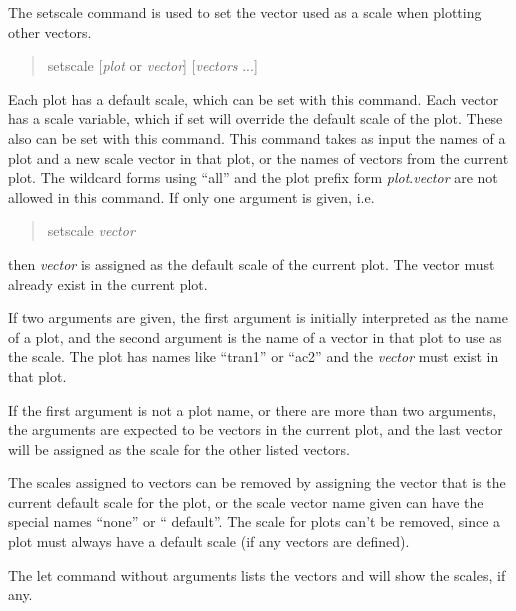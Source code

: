
The {\cb setscale} command is used to set the vector used as a scale
when plotting other vectors.
\begin{quote}\vt
setscale [{\it plot\/} or {\it vector\/}] [{\it vectors} ...]
\end{quote}
Each plot has a default scale, which can be set with this command. 
Each vector has a scale variable, which if set will override the
default scale of the plot.  These also can be set with this command. 
This command takes as input the names of a plot and a new scale vector
in that plot, or the names of vectors from the current plot.  The
wildcard forms using ``{\vt all}'' and the plot prefix form {\it
plot\/}.{\it vector} are not allowed in this command.  If only one
argument is given, i.e.
\begin{quote}
{\vt setscale} {\it vector}
\end{quote}
then {\it vector} is assigned as the default scale of the current plot.
The vector must already exist in the current plot.

If two arguments are given, the first argument is initially
interpreted as the name of a plot, and the second argument is the name
of a vector in that plot to use as the scale.  The plot has names like
``{\vt tran1}'' or ``{\vt ac2}'' and the {\it vector} must exist in
that plot.

If the first argument is not a plot name, or there are more than two
arguments, the arguments are expected to be vectors in the current
plot, and the last vector will be assigned as the scale for the other
listed vectors.

The scales assigned to vectors can be removed by assigning the vector
that is the current default scale for the plot, or the scale vector
name given can have the special names ``{\vt none}'' or ``{\vt
default}''.  The scale for plots can't be removed, since a plot must
always have a default scale (if any vectors are defined).

The {\cb let} command without arguments lists the vectors and will
show the scales, if any.

\subsection{}
\label{settype}



